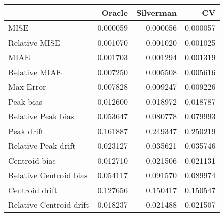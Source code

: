 \begin{tabular}{lrrr}
  \hline
 & Oracle & Silverman & CV \\ 
  \hline
MISE & 0.000059 & 0.000056 & 0.000057 \\ 
  Relative MISE & 0.001070 & 0.001020 & 0.001025 \\ 
  MIAE & 0.001703 & 0.001294 & 0.001319 \\ 
  Relative MIAE & 0.007250 & 0.005508 & 0.005616 \\ 
  Max Error & 0.007828 & 0.009247 & 0.009226 \\ 
  Peak bias & 0.012600 & 0.018972 & 0.018787 \\ 
  Relative Peak bias & 0.053647 & 0.080778 & 0.079993 \\ 
  Peak drift & 0.161887 & 0.249347 & 0.250219 \\ 
  Relative Peak drift & 0.023127 & 0.035621 & 0.035746 \\ 
  Centroid bias & 0.012710 & 0.021506 & 0.021131 \\ 
  Relative Centroid bias & 0.054117 & 0.091570 & 0.089974 \\ 
  Centroid drift & 0.127656 & 0.150417 & 0.150547 \\ 
  Relative Centroid drift & 0.018237 & 0.021488 & 0.021507 \\ 
   \hline
\end{tabular}
